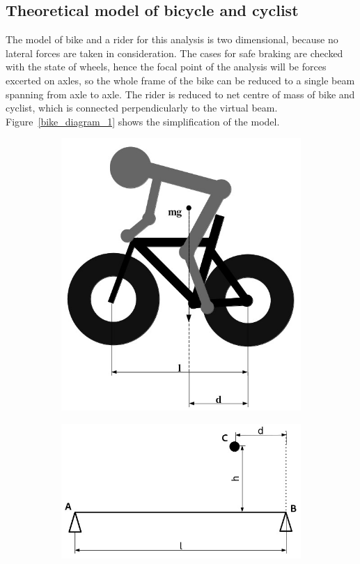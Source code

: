 \documentclass[12pt]{article}
\begin{document}
\subsection{Theoretical model of bicycle and cyclist}
The model of bike and a rider for this analysis is two dimensional, because no lateral forces are taken in 
consideration. The cases for safe braking are checked with the state of wheels, hence the focal point of the 
analysis will be forces excerted on axles, so the whole frame of the bike can be reduced to a single beam 
spanning from axle to axle. The rider is reduced to net centre of mass of bike and cyclist, which is connected
perpendicularly to the virtual beam. Figure~\ref{bike_diagram_1} shows the simplification of the model.
\begin{figure}[h]
\caption{}
\centering
\begin{subfigure}[b]{0.4\linewidth}
\includegraphics[width=\linewidth]{bike_static_model_bike}%
\label{fig:bike_diagram}
\caption{}
\end{subfigure}
\begin{subfigure}[b]{0.4\linewidth}
\includegraphics[width=\linewidth]{bike_static_model_simplified}

\end{subfigure}
\end{figure}
\end{document}
